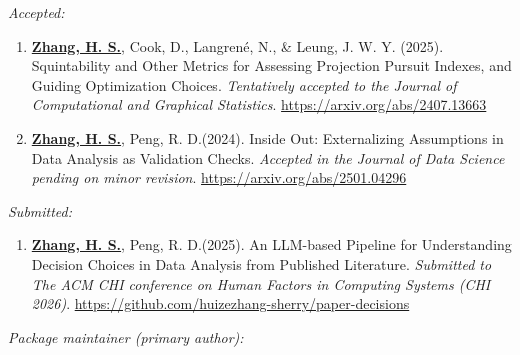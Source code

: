 \documentclass[10pt,a4paper]{article} %
\begin{document}
\noindent\textit{Accepted:}\vspace{-0.5em}
\begin{enumerate}[resume]

     \item \underline{\textbf{Zhang, H. S.}}, Cook, D., Langren\'e, N., \& Leung, J. W. Y. (2025). 
    Squintability and Other Metrics for Assessing Projection Pursuit Indexes, and Guiding 
    Optimization Choices. \emph{Tentatively accepted to the Journal of Computational and Graphical 
    Statistics}. \url{https://arxiv.org/abs/2407.13663}
    
    \item \underline{\textbf{Zhang, H. S.}}, Peng, R. D.(2024). Inside Out: Externalizing Assumptions 
    in Data Analysis as Validation Checks. \emph{Accepted in the Journal of Data Science pending on minor revision}. 
    \url{https://arxiv.org/abs/2501.04296}

\end{enumerate}

\noindent\textit{Submitted:}\vspace{-0.5em}
\begin{enumerate}[resume]

    
    \item \underline{\textbf{Zhang, H. S.}}, Peng, R. D.(2025). An LLM-based Pipeline for 
    Understanding Decision Choices in Data Analysis from Published Literature. 
    \emph{Submitted to The ACM CHI conference on Human Factors in Computing Systems (CHI 2026)}. 
    \url{https://github.com/huizezhang-sherry/paper-decisions}
    
  
\end{enumerate}


\noindent\textit{Package maintainer (primary author):}

\vspace{0.5em}

 \newline 
{} \newline
{} \newline 
\end{document}
